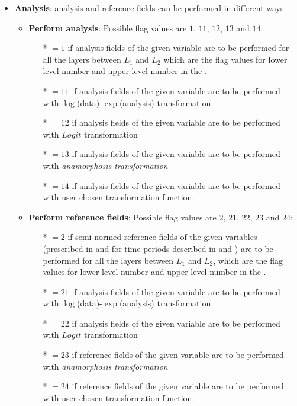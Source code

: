 \begin{itemize}
\item {\bf Analysis}: analysis and reference fields can be performed in different ways:
  \begin{itemize}
  \item  {\bf Perform analysis}: Possible flag values are $1$, $11$, $12$, $13$ and $14$:
              \begin{itemize}
                \item[*] $=1$ if analysis fields of the given variable are to be performed for all the layers between $L_1$ and $L_2$ which are the flag values for lower level number and upper level number in the .
                \item[*] $=11$ if analysis fields of the given variable are to be performed with $\log$(data)-$\exp$(analysis) transformation
                \item[*] $=12$ if analysis fields of the given variable are to be performed with $Logit$ transformation
                \item[*] $=13$ if analysis fields of the given variable are to be performed with \it{anamorphosis} transformation
                \item[*] $=14$ if analysis fields of the given variable are to be performed with user chosen transformation function.
              \end{itemize}
   \item  {\bf Perform reference fields}: Possible flag values are $2$, $21$, $22$, $23$ and $24$:
              \begin{itemize}
                \item[*] $=2$ if semi normed reference fields of the given variables (prescribed in  and for time periods described in  and ) are to be performed for all the layers between $L_1$ and $L_2$, which are the flag values for lower level number and upper level number in the .
                \item[*] $=21$ if analysis fields of the given variable are to be performed with $\log$(data)-$\exp$(analysis) transformation
                \item[*] $=22$ if analysis fields of the given variable are to be performed with $Logit$ transformation
                \item[*] $=23$ if reference fields of the given variable are to be performed with \it{anamorphosis} transformation
                \item[*] $=24$ if reference fields of the given variable are to be performed with user chosen transformation function.

\end{itemize}
\end{itemize}
\end{itemize}
